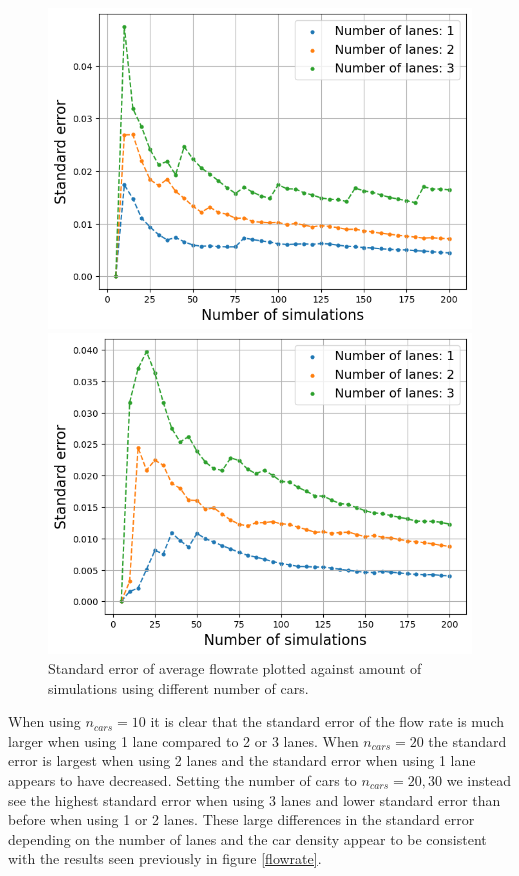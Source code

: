 \documentclass[a4paper,12pt]{article}
\begin{document}
\begin{figure}[H]
\begin{minipage}{.5\textwidth}
        \includegraphics[scale=0.47]{Images/standard error 30 cars.png}
    \end{minipage}%
    \begin{minipage}{.5\textwidth}
        \centering
        \includegraphics[scale=0.47]{Images/standard error 40 cars.png}
    \end{minipage}
    \caption{Standard error of average flowrate plotted against amount of simulations using different number of cars.}
    \label{standard error 1}
\end{figure}

When using $n_{cars}=10$ it is clear that the standard error of the flow rate is much larger when using 1 lane compared to 2 or 3 lanes.
When $n_{cars}=20$ the standard error is largest when using 2 lanes and the standard error when using 1 lane appears to have decreased.
Setting the number of cars to $n_{cars}=20, 30$ we instead see the highest standard error when using 3 lanes and lower standard error than before 
when using 1 or 2 lanes. These large differences in the standard error depending on the number of lanes and the car density appear to 
be consistent with the results seen previously in figure \ref*{flowrate}.
\end{document}
